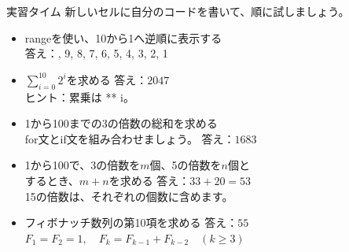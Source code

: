 \documentclass[12pt,aspectratio=43]{beamer}
\newcommand{\code}[1]{{\codefont #1}}
\begin{document}
\begin{frame}[t]{実習タイム}
  \setlength{\parskip}{0pt}
  新しいセルに自分のコードを書いて、順に試しましょう。
  \par\vspace{0mm}
  \begin{itemize}
    \setlength{\itemsep}{0.5mm}
    \item \code{range}を使い、10から1へ逆順に表示する\\
      {\small\textcolor{courseblue}{答え：\code{10, 9, 8, 7, 6, 5, 4, 3, 2, 1}}}
    \item \(\sum_{i=0}^{10}2^i\)を求める\quad
      \textcolor{courseblue}{答え：\(2047\)}\\
      {\small ヒント：累乗は\code{2 ** i}。}
    \item 1から100までの3の倍数の総和を求める\\
      {\small \code{for}文と\code{if}文を組み合わせましょう。\quad
        \textcolor{courseblue}{答え：\(1683\)}}
    \item 1から100で、3の倍数を\(m\)個、5の倍数を\(n\)個と\\
      するとき、\(m+n\)を求める\quad
      \textcolor{courseblue}{答え：\(33+20=53\)}\\
      {\small 15の倍数は、それぞれの個数に含めます。}
    \item フィボナッチ数列の第10項を求める\quad
      \textcolor{courseblue}{答え：\(55\)}\\
      {\small \(F_1=F_2=1,\quad F_k=F_{k-1}+F_{k-2}\quad(k\geq3)\)}
  \end{itemize}
\end{frame}
\end{document}
